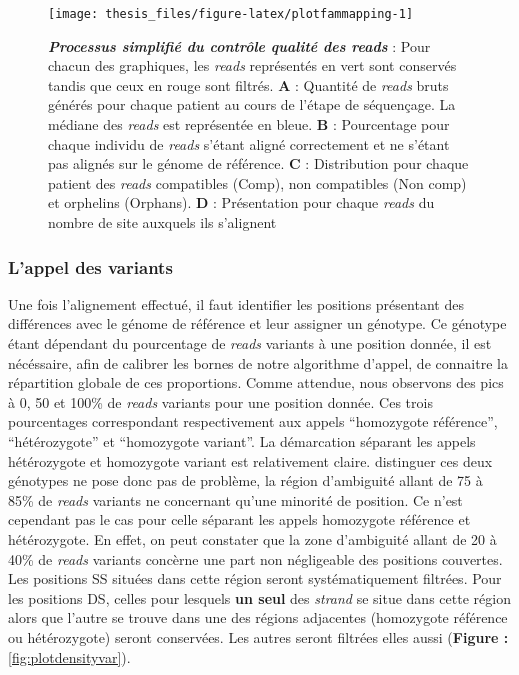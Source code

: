 \documentclass[12pt,twoside]{ugathesis}
\begin{document}
\begin{figure}

{\centering \texttt{[image: thesis\_files/figure-latex/plotfammapping-1]} 

}

\caption[Processus simplifié du contrôle qualité des *reads*]{\textbf{\emph{Processus simplifié du contrôle
qualité des \emph{reads}}} : Pour chacun des graphiques, les
\emph{reads} représentés en vert sont conservés tandis que ceux en rouge
sont filtrés. \textbf{A} : Quantité de \emph{reads} bruts générés pour
chaque patient au cours de l'étape de séquençage. La médiane des
\emph{reads} est représentée en bleue. \textbf{B} : Pourcentage pour
chaque individu de \emph{reads} s'étant aligné correctement et ne
s'étant pas alignés sur le génome de référence. \textbf{C} :
Distribution pour chaque patient des \emph{reads} compatibles (Comp),
non compatibles (Non comp) et orphelins (Orphans). \textbf{D} :
Présentation pour chaque \emph{reads} du nombre de site auxquels ils
s'alignent}\label{fig:plotfammapping}
\end{figure}














\newpage

\subsubsection{L'appel des variants}\label{lappel-des-variants-1}

Une fois l'alignement effectué, il faut identifier les positions
présentant des différences avec le génome de référence et leur assigner
un génotype. Ce génotype étant dépendant du pourcentage de \emph{reads}
variants à une position donnée, il est nécéssaire, afin de calibrer les
bornes de notre algorithme d'appel, de connaitre la répartition globale
de ces proportions. Comme attendue, nous observons des pics à 0, 50 et
100\% de \emph{reads} variants pour une position donnée. Ces trois
pourcentages correspondant respectivement aux appels ``homozygote
référence'', ``hétérozygote'' et ``homozygote variant''. La démarcation
séparant les appels hétérozygote et homozygote variant est relativement
claire. distinguer ces deux génotypes ne pose donc pas de problème, la
région d'ambiguité allant de 75 à 85\% de \emph{reads} variants ne
concernant qu'une minorité de position. Ce n'est cependant pas le cas
pour celle séparant les appels homozygote référence et hétérozygote. En
effet, on peut constater que la zone d'ambiguité allant de 20 à 40\% de
\emph{reads} variants concèrne une part non négligeable des positions
couvertes. Les positions SS situées dans cette région seront
systématiquement filtrées. Pour les positions DS, celles pour lesquels
\textbf{un seul} des \emph{strand} se situe dans cette région alors que
l'autre se trouve dans une des régions adjacentes (homozygote référence
ou hétérozygote) seront conservées. Les autres seront filtrées elles
aussi (\textbf{Figure : }\ref{fig:plotdensityvar}).
\end{document}
